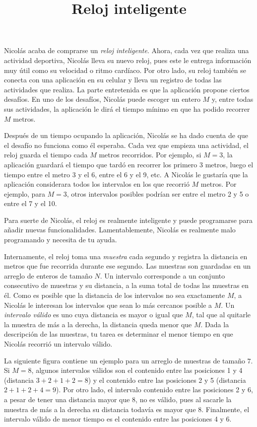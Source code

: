 \documentclass{oci}
\title{Reloj inteligente}
\begin{document}
\begin{problemDescription}
  Nicolás acaba de comprarse un \emph{reloj inteligente}.
  Ahora, cada vez que realiza una actividad deportiva, Nicolás lleva su nuevo
  reloj, pues este le entrega información muy útil como su velocidad o ritmo
  cardíaco.
  Por otro lado, su reloj también se conecta con una aplicación en su celular y
  lleva un registro de todas las actividades que realiza.
  La parte entretenida es que la aplicación propone ciertos desafíos.
  En uno de los desafíos, Nicolás puede escoger un entero $M$ y, entre todas sus
  actividades, la aplicación le dirá el tiempo mínimo en que ha podido recorrer
  $M$ metros.

  Después de un tiempo ocupando la aplicación, Nicolás se ha dado cuenta de que el
  desafío no funciona como él esperaba.
  Cada vez que empieza una actividad, el reloj guarda el tiempo cada $M$
  metros recorridos.
  Por ejemplo, si $M=3$, la aplicación guardará el tiempo que tardó en
  recorrer los primero 3 metros, luego el tiempo entre el metro 3 y
  el 6, entre el 6 y el 9, etc.
  A Nicolás le gustaría que la aplicación considerara todos los intervalos en
  los que recorrió $M$ metros.
  Por ejemplo, para $M=3$, otros intervalos posibles podrían ser entre el
  metro 2 y 5 o entre el 7 y el 10.

  Para suerte de Nicolás, el reloj es realmente inteligente y puede
  programarse para añadir nuevas funcionalidades.
  Lamentablemente, Nicolás es realmente malo programando y necesita de tu ayuda.

  Internamente, el reloj toma una \emph{muestra} cada segundo y registra la
  distancia en metros que fue recorrida durante ese segundo.
  Las muestras son guardadas en un arreglo de enteros de tamaño $N$.
  Un intervalo corresponde a un conjunto consecutivo de muestras y su distancia,
  a la suma total de todas las muestras en él.
  Como es posible que la distancia de los intervalos no sea exactamente $M$,
  a Nicolás le interesan los intervalos que sean lo más cercanos posible a $M$.
  Un \emph{intervalo válido} es uno cuya distancia es mayor o igual que $M$,
  tal que al quitarle la muestra de más a la derecha, la distancia queda menor
  que $M$.
  Dada la descripción de las muestras, tu tarea es determinar el menor tiempo en
  que Nicolás recorrió un intervalo válido.

  La siguiente figura contiene un ejemplo para un arreglo de muestras de tamaño
  $7$.
  Si $M=8$, algunos intervalos válidos son el contenido entre las posiciones 1 y
  4 (distancia $3+2+1+2=8$) y el contenido entre las posiciones 2 y 5 (distancia
  $2+1+2+4=9$).
  Por otro lado, el intervalo contenido entre las posiciones 2 y 6, a pesar de
  tener una distancia mayor que 8, no es válido, pues al sacarle la muestra de más
  a la derecha su distancia todavía es mayor que 8.
  Finalmente, el intervalo válido de menor tiempo es el contenido entre las
  posiciones 4 y 6.


\end{problemDescription}
\end{document}
